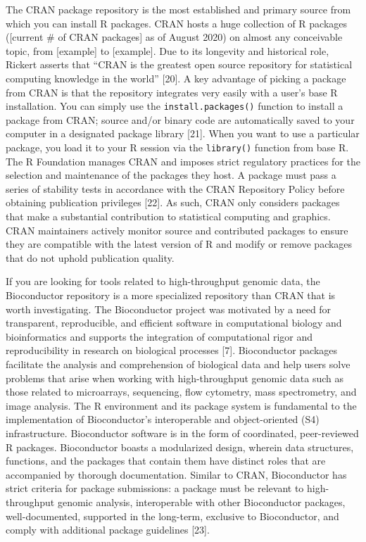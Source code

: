 \documentclass[10pt,letterpaper]{article}
\begin{document}
The CRAN package repository is the most established and primary source
from which you can install R packages. CRAN hosts a huge collection of R
packages ({[}current \# of CRAN packages{]} as of August 2020) on almost
any conceivable topic, from {[}example{]} to {[}example{]}. Due to its
longevity and historical role, Rickert asserts that ``CRAN is the
greatest open source repository for statistical computing knowledge in
the world'' {[}20{]}. A key advantage of picking a package from CRAN is
that the repository integrates very easily with a user's base R
installation. You can simply use the \texttt{install.packages()}
function to install a package from CRAN; source and/or binary code are
automatically saved to your computer in a designated package library
{[}21{]}. When you want to use a particular package, you load it to your
R session via the \texttt{library()} function from base R. The R
Foundation manages CRAN and imposes strict regulatory practices for the
selection and maintenance of the packages they host. A package must pass
a series of stability tests in accordance with the CRAN Repository
Policy before obtaining publication privileges {[}22{]}. As such, CRAN
only considers packages that make a substantial contribution to
statistical computing and graphics. CRAN maintainers actively monitor
source and contributed packages to ensure they are compatible with the
latest version of R and modify or remove packages that do not uphold
publication quality.

If you are looking for tools related to high-throughput genomic data,
the Bioconductor repository is a more specialized repository than CRAN
that is worth investigating. The Bioconductor project was motivated by a
need for transparent, reproducible, and efficient software in
computational biology and bioinformatics and supports the integration of
computational rigor and reproducibility in research on biological
processes {[}7{]}. Bioconductor packages facilitate the analysis and
comprehension of biological data and help users solve problems that
arise when working with high-throughput genomic data such as those
related to microarrays, sequencing, flow cytometry, mass spectrometry,
and image analysis. The R environment and its package system is
fundamental to the implementation of Bioconductor's interoperable and
object-oriented (S4) infrastructure. Bioconductor software is in the
form of coordinated, peer-reviewed R packages. Bioconductor boasts a
modularized design, wherein data structures, functions, and the packages
that contain them have distinct roles that are accompanied by thorough
documentation. Similar to CRAN, Bioconductor has strict criteria for
package submissions: a package must be relevant to high-throughput
genomic analysis, interoperable with other Bioconductor packages,
well-documented, supported in the long-term, exclusive to Bioconductor,
and comply with additional package guidelines {[}23{]}.
\end{document}
